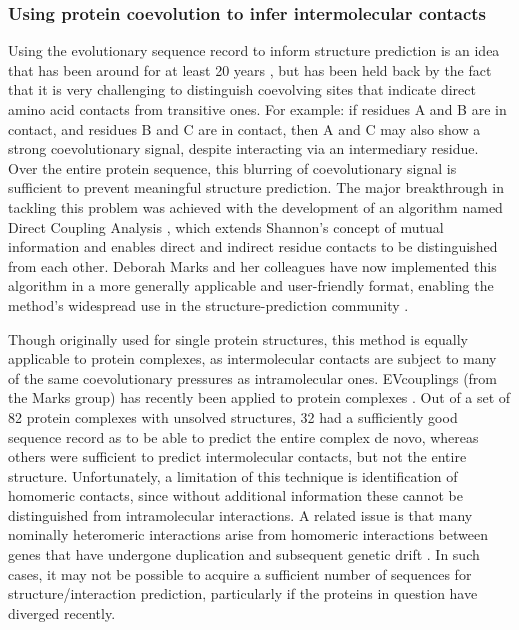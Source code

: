 \documentclass[a4paper,11pt,twoside,openright]{scrbook}
\begin{document}
\subsubsection{Using protein coevolution to infer intermolecular contacts}
Using the evolutionary sequence record to inform structure prediction is an idea
that has been around for at least 20 years \cite{Altschuh1987}, but has been
held back by the fact that it is very challenging to distinguish coevolving
sites that indicate direct amino acid contacts from transitive ones. For
example: if residues A and B are in contact, and residues B and C are in
contact, then A and C may also show a strong coevolutionary signal, despite
interacting via an intermediary residue. Over the entire protein sequence, this
blurring of coevolutionary signal is sufficient to prevent meaningful structure
prediction. The major breakthrough in tackling this problem was achieved with
the development of an algorithm named Direct Coupling Analysis
\cite{Weigt2009,Lunt2010}, which extends Shannon's concept of mutual information
\cite{Shannon1948} and enables direct and indirect residue contacts to be
distinguished from each other. Deborah Marks and her colleagues have now
implemented this algorithm in a more generally applicable and user-friendly
format, enabling the method’s widespread use in the structure-prediction
community \cite{Marks2011,Marks2012,Hopf2014}.

Though originally used for single protein structures, this method is equally
applicable to protein complexes, as intermolecular contacts are subject to many
of the same coevolutionary pressures as intramolecular ones. EVcouplings (from
the Marks group) has recently been applied to protein complexes \cite{Hopf2014}.
Out of a set of 82 protein complexes with unsolved structures, 32 had a
sufficiently good sequence record as to be able to predict the entire complex de
novo, whereas others were sufficient to predict intermolecular contacts, but not
the entire structure. Unfortunately, a limitation of this technique is
identification of homomeric contacts, since without additional information these
cannot be distinguished  from intramolecular interactions. A related issue is
that many nominally heteromeric interactions arise from homomeric interactions
between genes that have undergone duplication and subsequent genetic drift
\cite{Wagner2001,Wagner2003,Fokkens2012}. In such cases, it may not be possible
to acquire a sufficient number of sequences for structure/interaction
prediction, particularly if the proteins in question have diverged recently.
\end{document}
